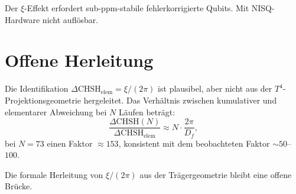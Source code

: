 Der $\xi$-Effekt erfordert sub-ppm-stabile fehlerkorrigierte Qubits.
Mit NISQ-Hardware nicht auflösbar.

\section{Offene Herleitung}

Die Identifikation $\Delta\mathrm{CHSH}_{\mathrm{elem}} = \xi/(2\pi)$
ist plausibel, aber nicht aus der $T^4$-Projektionsgeometrie hergeleitet.
Das Verhältnis zwischen kumulativer und elementarer Abweichung bei
$N$ Läufen beträgt:
\begin{equation}
  \frac{\Delta\mathrm{CHSH}(N)}{\Delta\mathrm{CHSH}_{\mathrm{elem}}}
  \approx N\cdot\frac{2\pi}{D_f},
\end{equation}
bei $N=73$ einen Faktor $\approx153$, konsistent mit dem beobachteten
Faktor $\sim50$--$100$.

Die formale Herleitung von $\xi/(2\pi)$ aus der Trägergeometrie
bleibt eine offene Brücke.

